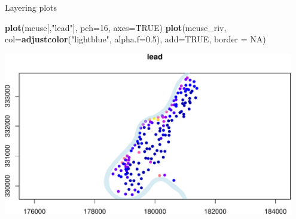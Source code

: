 \documentclass[11pt,ignorenonframetext,]{beamer}
\newenvironment{Shaded}{}{}
\newcommand{\KeywordTok}[1]{\textcolor[rgb]{0.00,0.44,0.13}{\textbf{#1}}}
\newcommand{\DataTypeTok}[1]{\textcolor[rgb]{0.56,0.13,0.00}{#1}}
\newcommand{\DecValTok}[1]{\textcolor[rgb]{0.25,0.63,0.44}{#1}}
\newcommand{\FloatTok}[1]{\textcolor[rgb]{0.25,0.63,0.44}{#1}}
\newcommand{\StringTok}[1]{\textcolor[rgb]{0.25,0.44,0.63}{#1}}
\newcommand{\OtherTok}[1]{\textcolor[rgb]{0.00,0.44,0.13}{#1}}
\newcommand{\NormalTok}[1]{#1}
\let\oldShaded\Shaded
\let\endoldShaded\endShaded
\renewenvironment{Shaded}{\footnotesize\begin{spacing}{0.9}\oldShaded}{\endoldShaded\end{spacing}}
\let\oldverbatim\verbatim
\let\endoldverbatim\endverbatim
\newcommand{\scriptoutput}{
  \renewenvironment{Shaded}{\scriptsize\begin{spacing}{0.9}\oldShaded}{\endoldShaded\end{spacing}}
  \renewenvironment{verbatim}{\scriptsize\begin{spacing}{0.9}\oldverbatim}{\endoldverbatim\end{spacing}}
}
\begin{document}
\begin{frame}[fragile,t]{Layering plots}

\scriptoutput

\begin{Shaded}
\begin{Highlighting}[]
\KeywordTok{plot}\NormalTok{(meuse[,}\StringTok{"lead"}\NormalTok{], }\DataTypeTok{pch=}\DecValTok{16}\NormalTok{, }\DataTypeTok{axes=}\OtherTok{TRUE}\NormalTok{)}
\KeywordTok{plot}\NormalTok{(meuse_riv, }\DataTypeTok{col=}\KeywordTok{adjustcolor}\NormalTok{(}\StringTok{"lightblue"}\NormalTok{, }\DataTypeTok{alpha.f=}\FloatTok{0.5}\NormalTok{), }\DataTypeTok{add=}\OtherTok{TRUE}\NormalTok{, }\DataTypeTok{border =} \OtherTok{NA}\NormalTok{)}
\end{Highlighting}
\end{Shaded}

\begin{center}\includegraphics[width=0.95\textwidth]{Lec17_files/figure-beamer/unnamed-chunk-10-1} \end{center}

\end{frame}
\end{document}
